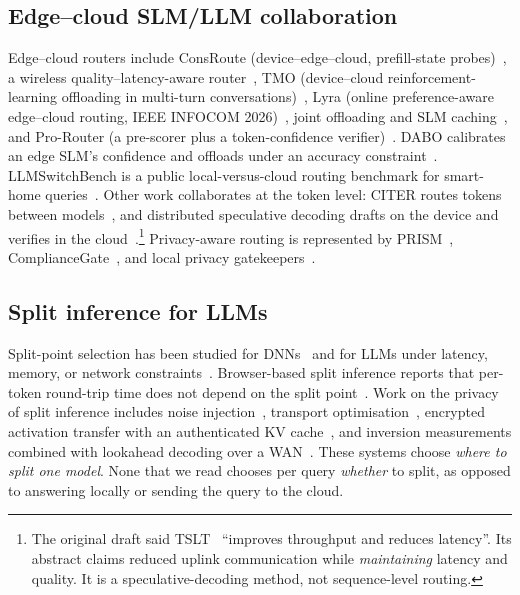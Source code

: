 \documentclass[lettersize,journal]{IEEEtran}
\begin{document}
\subsection{Edge--cloud SLM/LLM collaboration}
Edge--cloud routers include ConsRoute (device--edge--cloud, prefill-state
probes)~\cite{qiao2026consroute}, a wireless quality--latency-aware
router~\cite{bao2025dynamic}, TMO (device--cloud reinforcement-learning offloading
in multi-turn conversations)~\cite{yuan2025device}, Lyra (online preference-aware
edge--cloud routing, IEEE INFOCOM 2026)~\cite{ma2026preference}, joint offloading
and SLM caching~\cite{xu2026joint}, and Pro-Router (a pre-scorer plus a
token-confidence verifier)~\cite{gui2026pro}. DABO calibrates an edge SLM's
confidence and offloads under an accuracy constraint~\cite{zhu2026dabo}.
LLMSwitchBench is a public local-versus-cloud routing benchmark for smart-home
queries~\cite{liu2025llmswitchbench}. Other work collaborates at the token level:
CITER routes tokens between models~\cite{zheng2025citer}, and distributed
speculative decoding drafts on the device and verifies in the
cloud~\cite{zheng2026fast,xu2026dip,zhang2026pipelined}.\footnote{The original
draft said TSLT~\cite{zheng2026fast} ``improves throughput and reduces latency''.
Its abstract claims reduced uplink communication while \emph{maintaining}
latency and quality. It is a speculative-decoding method, not sequence-level
routing.} Privacy-aware routing is represented by PRISM~\cite{zhan2025prism},
ComplianceGate~\cite{dey2026compliancegate}, and local privacy
gatekeepers~\cite{uzor2025guarding,langiu2026privacy}.

\subsection{Split inference for LLMs}
Split-point selection has been studied for DNNs~\cite{kang2017neurosurgeon} and
for LLMs under latency, memory, or network constraints~\cite{chen2024adaptive,sung2025memory,mudvari2024splitllm,younesi2025splitwise,kafetzis2025large,djuhera2025joint,feng2025distributed}.
Browser-based split inference reports that per-token round-trip time does not
depend on the split point~\cite{lee2026browser}. Work on the privacy of split
inference includes noise injection~\cite{mai2024split}, transport
optimisation~\cite{zhou2025poster}, encrypted activation transfer with an authenticated KV cache~\cite{li2026efficient},
and inversion measurements combined with lookahead decoding over a WAN~\cite{cunningham2026privacy}.
These systems choose \emph{where to split one model}. None that we read chooses
per query \emph{whether} to split, as opposed to answering locally or sending the
query to the cloud.
\end{document}
